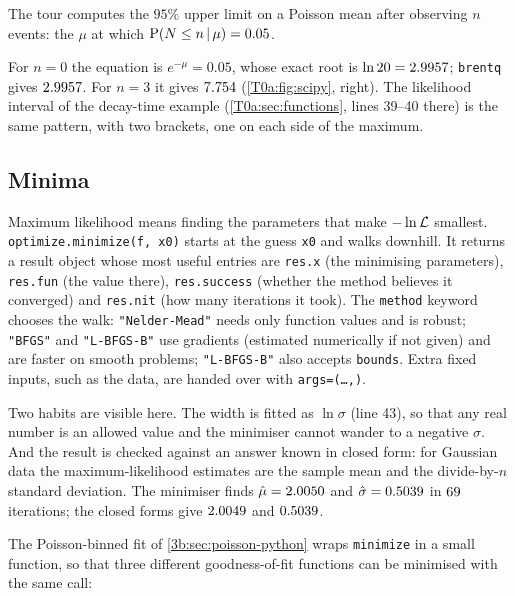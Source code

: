 The tour computes the $95\%$ upper limit on a Poisson mean after observing $n$ events: the $\mu$ at which $\operatorname{P}(N\le n\,\vert\,\mu)=0.05$.


For $n=0$ the equation is $e^{-\mu}=0.05$, whose exact root is $\ln20=2.9957$; \texttt{brentq} gives $2.9957$. For $n=3$ it gives $7.754$ (\cref{T0a:fig:scipy}, right). The likelihood interval of the decay-time example (\cref{T0a:sec:functions}, lines 39--40 there) is the same pattern, with two brackets, one on each side of the maximum.

\subsection{Minima}
\label{T0a:sec:minimize}

{\sloppy Maximum likelihood means finding the parameters that make $-\ln\mathcal{L}$ smallest. \texttt{optimize.minimize(f, x0)} starts at the guess \texttt{x0} and walks downhill. It returns a result object whose most useful entries are \texttt{res.x} (the minimising parameters), \texttt{res.fun} (the value there), \texttt{res.success} (whether the method believes it converged) and \texttt{res.nit} (how many iterations it took). The \texttt{method} keyword chooses the walk: \texttt{"Nelder-Mead"} needs only function values and is robust; \texttt{"BFGS"} and \texttt{"L-BFGS-B"} use gradients (estimated numerically if not given) and are faster on smooth problems; \texttt{"L-BFGS-B"} also accepts \texttt{bounds}. Extra fixed inputs, such as the data, are handed over with \texttt{args=(\dots,)}.\par}


Two habits are visible here. The width is fitted as $\ln\sigma$ (line 43), so that any real number is an allowed value and the minimiser cannot wander to a negative $\sigma$. And the result is checked against an answer known in closed form: for Gaussian data the maximum-likelihood estimates are the sample mean and the divide-by-$n$ standard deviation. The minimiser finds $\hat\mu=2.0050$ and $\hat\sigma=0.5039$ in $69$ iterations; the closed forms give $2.0049$ and $0.5039$.

The Poisson-binned fit of \cref{3b:sec:poisson-python} wraps \texttt{minimize} in a small function, so that three different goodness-of-fit functions can be minimised with the same call:

